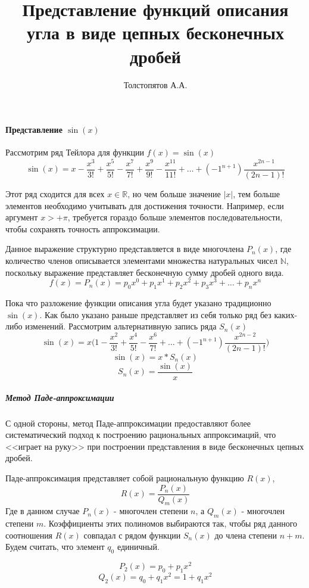 \documentclass{article}
\title{Представление функций описания угла в виде цепных бесконечных дробей}
\author{Толстопятов А.А.}
\begin{document}
    \maketitle    
    \paragraph*{Представление $\sin(x)$}
    Рассмотрим ряд Тейлора для функции $f(x) = \sin(x)$
    $$\sin(x) = x - \frac{x^3}{3!} + \frac{x^5}{5!} - \frac{x^7}{7!} + \frac{x^9}{9!} - \frac{x^{11}}{11!} + \dots + (-1^{n+1})\frac{x^{2n-1}}{(2n-1)!}$$
    
    Этот ряд сходится для всех $x\in\mathbb{R}$, но чем больше значение $|x|$,
    тем больше элементов необходимо учитывать для достижения точности.
    Например, если аргумент $x > +\pi$, требуется гораздо больше 
    элементов последовательности, чтобы сохранять точность аппроксимации.
    
    Данное выражение структурно представляется в виде 
    многочлена $P_n(x)$, где количество членов описывается 
    элементами множества натуральных чисел $\mathbb{N}$, 
    поскольку выражение представляет бесконечную сумму дробей одного вида.
    $$f(x) = P_n(x) = p_0x^0 + p_1x^1 + p_2x^2 + p_3x^3 + \dots + p_nx^n$$

    Пока что разложение функции описания угла будет указано традиционно $\sin(x)$.
    Как было указано раньше представляет из себя только ряд без каких-либо изменений.
    Рассмотрим альтернативную запись ряда $S_n(x)$
    $$\sin(x) = x\Bigg(1 - \frac{x^2}{3!} + \frac{x^4}{5!} - \frac{x^6}{7!} + \dots + (-1^{n+1})\frac{x^{2n-2}}{(2n-1)!}\Bigg)$$
    $$\sin(x) = x * S_n(x)$$
    $$S_n(x) = \frac{\sin(x)}{x}$$

    \subparagraph{Метод Паде-аппроксимации}
    
    С одной стороны, метод Паде-аппроксимации предоставляют 
    более систематический подход к построению рациональных аппроксимаций,
    что <<играет на руку>> при построении представления в виде бесконечных
    цепных дробей. 
    
    Паде-аппроксимация представляет собой рациональную функцию 
    $R(x)$,
    $$R(x) = \frac{P_n(x)}{Q_m(x)}$$
    Где в данном случае $P_n(x)$ - многочлен степени $n$, а $Q_m(x)$ - многочлен степени $m$. 
    Коэффициенты этих полиномов выбираются так, 
    чтобы ряд данного соотношения $R(x)$ совпадал с рядом функции
    $S_n(x)$ до члена степени $n+m$. Будем считать, что элемент $q_0$ единичный.

    $$P_2(x) = p_0 + p_1x^2$$
    $$Q_2(x) = q_0 + q_1x^2 = 1 + q_1x^2$$
\end{document}
